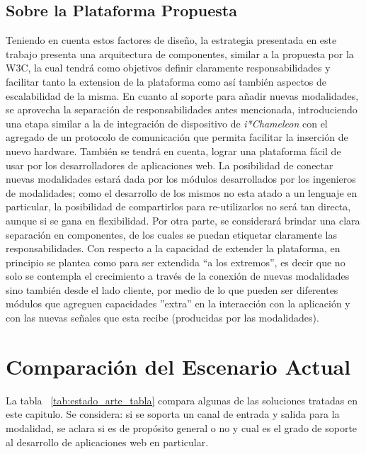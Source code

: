 \subsection{Sobre la Plataforma Propuesta}
Teniendo en cuenta estos factores de diseño, la estrategia presentada en este trabajo presenta una arquitectura de componentes, similar a la propuesta por la W3C, la cual tendrá como objetivos definir claramente responsabilidades y facilitar tanto la extension de la plataforma como así también aspectos de escalabilidad de la misma. En cuanto al soporte para añadir nuevas modalidades, se aprovecha la separación de responsabilidades antes mencionada, introduciendo una etapa similar a la de integración de dispositivo de \emph{i*Chameleon} con el agregado de un protocolo de comunicación que permita facilitar la inserción de nuevo hardware.
También se tendrá en cuenta, lograr una plataforma fácil de usar por los desarrolladores de aplicaciones web. La posibilidad de conectar nuevas modalidades estará dada por los módulos desarrollados por los ingenieros de modalidades; como el desarrollo de los mismos no esta atado a un lenguaje en particular, la posibilidad de compartirlos para re-utilizarlos no será tan directa, aunque si se gana en flexibilidad. Por otra parte, se considerará brindar una clara separación en componentes, de los cuales se puedan etiquetar claramente las responsabilidades. Con respecto a la capacidad de extender la plataforma, en principio se plantea como para ser extendida ``a los extremos'', es decir que no solo se contempla el crecimiento a través de la conexión de nuevas modalidades sino también desde el lado cliente, por medio de lo que pueden ser diferentes módulos que agreguen capacidades ''extra'' en la interacción con la aplicación y con las nuevas señales que esta recibe (producidas por las modalidades).

\section{Comparación del Escenario Actual}
La tabla ~\ref{tab:estado_arte_tabla} compara algunas de las soluciones tratadas en este capitulo. Se considera: si se soporta un canal de entrada y salida para la modalidad, se aclara si es de propósito general o no y cual es el grado de soporte al desarrollo de aplicaciones web en particular.

